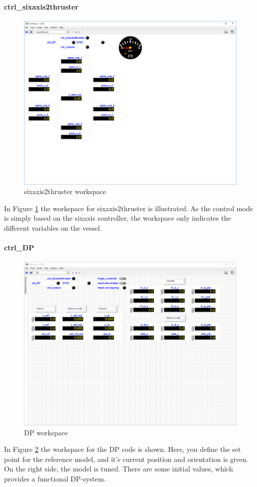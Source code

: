\paragraph{ctrl\_sixaxis2thruster}
\begin{figure}[htb!]
	\centering
	\includegraphics[width=\linewidth]{fig/CSAD_workspace_sixaxis2thruster.png}
	\caption{sixaxis2thruster workspace}
	\label{fig:workspace_sixaxis2thruster}
\end{figure}
In Figure \ref{fig:workspace_sixaxis2thruster} the workspace for sixaxis2thruster is illustrated. As the control mode is simply based on the sixaxis controller, the workspace only indicates the different variables on the vessel. 
\paragraph{ctrl\_DP}
\begin{figure}[htb!]
	\centering
	\includegraphics[width=\textwidth]{fig/CSAD_workspace_DP.png}
	\caption{DP workspace}
	\label{fig:workspace_DP}
\end{figure}
In Figure \ref{fig:workspace_DP} the workspace for the DP code is shown. Here, you define the set point for the reference model, and it's current position and orientation is given. On the right side, the model is tuned. There are some initial values, which provides a functional DP-system. 
